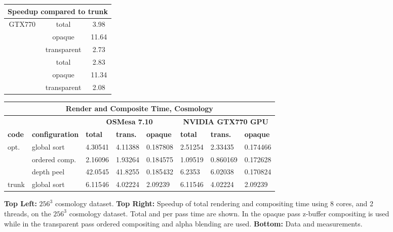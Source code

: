 \documentclass[a4paper,10pt]{report}
\begin{document}
\begin{figure}
\begin{minipage}{1.0\textwidth}
\begin{center}
\def\arraystretch{1.25}
{\footnotesize
\begin{tabular}{|c|c|c|}
\hline
\multicolumn{3}{|c|}{\bf{Speedup compared to trunk}} \\ \hline
\multirow{4}{*}{GTX770} & total & 3.98 \\ \cline{2-3}
 & opaque & 11.64 \\ \cline{2-3}
 & transparent & 2.73 \\ \hline
\multirow{3}{*}{OSMesa} & total & 2.83 \\ \cline{2-3}
 & opaque & 11.34 \\ \cline{2-3}
 & transparent & 2.08  \\ \hline
\end{tabular}}
\end{center}
\end{minipage}
\begin{minipage}{1.0\textwidth}
\begin{center}
{\footnotesize
\def\arraystretch{1.25}
\begin{tabular}{|l|l|l|l|l|l|l|l|}
\hline
\multicolumn{8}{|c|}{\bf Render and Composite Time, Cosmology} \\ \hline
\multicolumn{2}{|c|}{}& \multicolumn{3}{|c|}{\bf OSMesa 7.10 } & \multicolumn{3}{|c|}{\bf NVIDIA GTX770 GPU} \\ \hline
{\bf code} & {\bf configuration} & {\bf total} & {\bf trans.} & {\bf opaque} & {\bf total} & {\bf trans.} & {\bf opaque} \\ \hline
\multirow{3}{*}{opt.} & global sort &  4.30541 & 4.11388 & 0.187808 & 2.51254 & 2.33435 & 0.174466 \\ \cline{2-8}
 & ordered comp. & 2.16096 & 1.93264 & 0.184575 & 1.09519 & 0.860169 & 0.172628 \\ \cline{2-8}
 & depth peel & 42.0545 & 41.8255 & 0.185432 & 6.2353 & 6.02038 & 0.170824 \\ \hline
trunk & global sort &  6.11546 & 4.02224 & 2.09239 & 6.11546 & 4.02224 & 2.09239 \\ \hline
\end{tabular}}
\end{center}
\end{minipage}
\caption{\footnotesize {\bf Top Left:} $256^3$ cosmology dataset. {\bf Top Right:} Speedup of total rendering and compositing time using 8 cores, and 2 threads, on the $256^3$ cosmology dataset. Total and per pass time are shown. In the opaque pass z-buffer compositing is used while in the transparent pass ordered compositing and alpha blending are used. {\bf Bottom:} Data and measurements.}
\label{fig:speedup_cosmo}
\end{figure}
\end{document}
